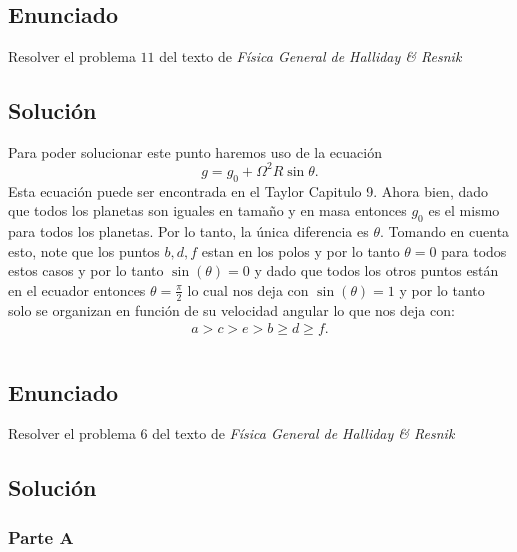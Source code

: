 \documentclass{report}
\begin{document}
\chapter{}

\section{Enunciado}

Resolver el problema $11$ del texto de \textit{Física General de Halliday \& Resnik}

\section{Solución}

Para poder solucionar este punto haremos uso de la ecuación \[
g = g_0 + \Omega^2 R \sin\theta
.\] Esta ecuación puede ser encontrada en el Taylor Capitulo 9. Ahora bien, dado que todos los planetas son iguales en tamaño y en masa entonces $g_0$ es el mismo para todos los planetas. Por lo tanto, la única diferencia es $\theta$. Tomando en cuenta esto, note que los puntos $b, d, f$ estan en los polos y por lo tanto  $\theta = 0$ para todos estos casos y por lo tanto $\sin\left( \theta \right) = 0$ y dado que todos los otros puntos están en el ecuador entonces $\theta = \frac{\pi}{2}$ lo cual nos deja con $\sin\left( \theta \right) = 1$ y por lo tanto solo se organizan en función de su velocidad angular lo que nos deja con:
\begin{align*}
  a > c > e > b \ge d \ge f
.\end{align*}

\chapter{}

\section{Enunciado}

Resolver el problema $6$ del texto de \textit{Física General de Halliday \& Resnik}

\section{Solución}

\subsection{Parte A}
\end{document}
